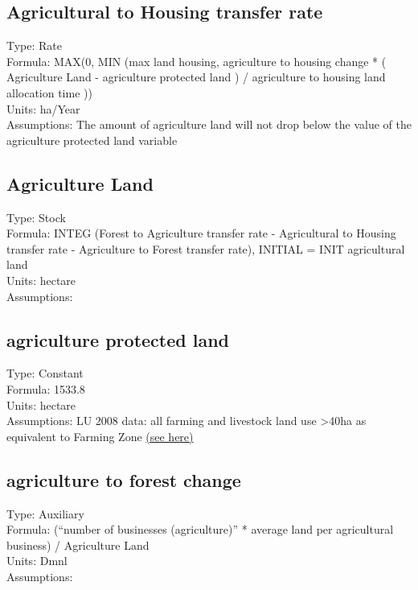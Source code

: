 \documentclass[
  11pt,
]{book}
\begin{document}
\hypertarget{agricultural-to-housing-transfer-rate}{%
\subsection{Agricultural to Housing transfer rate}\label{agricultural-to-housing-transfer-rate}}

Type: Rate\\
Formula: MAX(0, MIN (max land housing, agriculture to housing change * ( Agriculture Land - agriculture protected land ) / agriculture to housing land allocation time ))\\
Units: ha/Year\\
Assumptions: The amount of agriculture land will not drop below the value of the agriculture protected land variable

\hypertarget{agriculture-land}{%
\subsection{Agriculture Land}\label{agriculture-land}}

Type: Stock\\
Formula: INTEG (Forest to Agriculture transfer rate - Agricultural to Housing transfer rate -
Agriculture to Forest transfer rate), INITIAL = INIT agricultural land\\
Units: hectare\\
Assumptions:

\hypertarget{agriculture-protected-land}{%
\subsection{agriculture protected land}\label{agriculture-protected-land}}

Type: Constant\\
Formula: 1533.8\\
Units: hectare\\
Assumptions: LU 2008 data: all farming and livestock land use \textgreater40ha as equivalent to Farming Zone \href{https://www.planning.vic.gov.au/__data/assets/pdf_file/0027/97182/PPN42-Applying-the-Rural-Zones_June-2015.pdf}{(see here)}

\hypertarget{agriculture-to-forest-change}{%
\subsection{agriculture to forest change}\label{agriculture-to-forest-change}}

Type: Auxiliary\\
Formula: (``number of businesses (agriculture)'' * average land per agricultural business) / Agriculture Land\\
Units: Dmnl\\
Assumptions:
\end{document}

